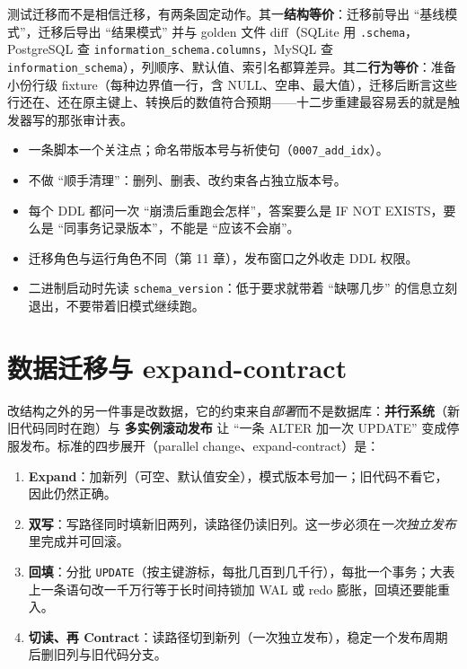 \documentclass[12pt,a4paper,fontset=fandol]{ctexbook}
\newcommand{\Tp}[1]{\texttt{#1}}
\begin{document}
测试迁移而不是相信迁移，有两条固定动作。其一\textbf{结构等价}：迁移前导出 ``基线模式''，迁移后导出 ``结果模式'' 并与 golden 文件 diff（SQLite 用 \texttt{.schema}，PostgreSQL 查 \Tp{information\_\allowbreak schema.columns}，MySQL 查 \Tp{information\_schema}），列顺序、默认值、索引名都算差异。其二\textbf{行为等价}：准备小份行级 fixture（每种边界值一行，含 NULL、空串、最大值），迁移后断言这些行还在、还在原主键上、转换后的数值符合预期——十二步重建最容易丢的就是触发器写的那张审计表。

\begin{bestpractice}[title=迁移脚本的评审清单]
\begin{itemize}
  \item 一条脚本一个关注点；命名带版本号与祈使句（\Tp{0007\_add\_idx}）。
  \item 不做 ``顺手清理''：删列、删表、改约束各占独立版本号。
  \item 每个 DDL 都问一次 ``崩溃后重跑会怎样''，答案要么是 IF NOT EXISTS，要么是 ``同事务记录版本''，不能是 ``应该不会崩''。
  \item 迁移角色与运行角色不同（第 11 章），发布窗口之外收走 DDL 权限。
  \item 二进制启动时先读 \Tp{schema\_version}：低于要求就带着 ``缺哪几步'' 的信息立刻退出，不要带着旧模式继续跑。
\end{itemize}
\end{bestpractice}

\section{数据迁移与 expand-contract}

改结构之外的另一件事是改数据，它的约束来自\emph{部署}而不是数据库：\textbf{并行系统}（新旧代码同时在跑）与 \textbf{多实例滚动发布} 让 ``一条 ALTER 加一次 UPDATE'' 变成停服发布。标准的四步展开（parallel change、expand-contract）是：

\begin{enumerate}
  \item \textbf{Expand}：加新列（可空、默认值安全），模式版本号加一；旧代码不看它，因此仍然正确。
  \item \textbf{双写}：写路径同时填新旧两列，读路径仍读旧列。这一步必须在\emph{一次独立发布}里完成并可回滚。
  \item \textbf{回填}：分批 \texttt{UPDATE}（按主键游标，每批几百到几千行），每批一个事务；大表上一条语句改一千万行等于长时间持锁加 WAL 或 redo 膨胀，回填还要能重入。
  \item \textbf{切读、再 Contract}：读路径切到新列（一次独立发布），稳定一个发布周期后删旧列与旧代码分支。
\end{enumerate}
\end{document}
